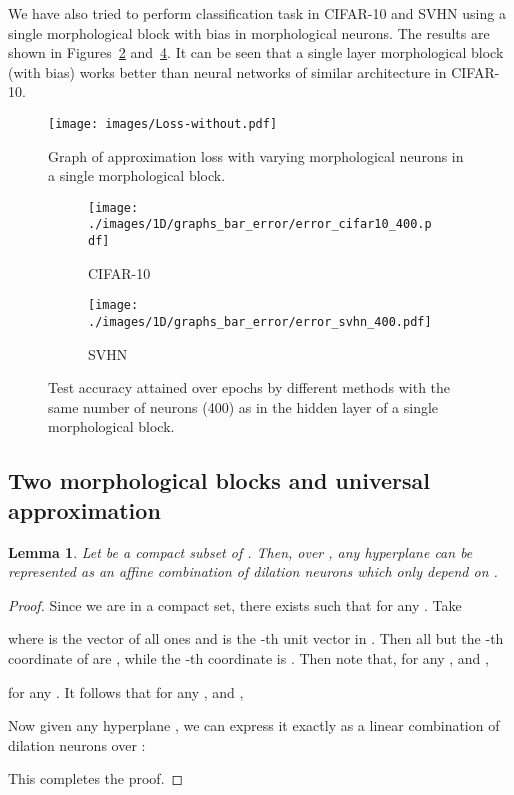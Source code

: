 \documentclass[12pt]{article}
\newtheorem{lemma}{Lemma}
\begin{document}
We have also tried to perform classification task in CIFAR-10 and SVHN using a single morphological block with bias in morphological neurons. The results are shown in Figures~\ref{cifar10_lc} and~\ref{svhn_lc}. It can be seen that a single layer morphological block (with bias) works better than neural networks of similar architecture in CIFAR-10.

\begin{figure}
    \centering
    \texttt{[image: images/Loss-without.pdf]}
    \caption{Graph of approximation loss with varying  morphological neurons in a single morphological block.}
    \label{fig:morph-block}
\end{figure}

\begin{figure}
    \centering
    \begin{subfigure}[t]{0.49\linewidth}
        \texttt{[image: ./images/1D/graphs\_bar\_error/error\_cifar10\_400.pdf]}
        \caption{CIFAR-10}
        \label{cifar10_lc}
    \end{subfigure}
    \begin{subfigure}[t]{0.49\linewidth}
        \texttt{[image: ./images/1D/graphs\_bar\_error/error\_svhn\_400.pdf]}
                \caption{SVHN}
        \label{svhn_lc}
            \end{subfigure}
\caption{Test accuracy attained over epochs by different methods with the same number of neurons (400) as in the hidden layer of a single morphological block.}
\end{figure}

\subsection{Two morphological blocks and universal approximation}

\begin{lemma}\label{lem:hyp_rep}
Let  be a compact subset of . Then, over , any hyperplane  can be represented as an affine combination of  dilation neurons which only depend on .
\end{lemma}
\begin{proof}
Since we are in a compact set, there exists  such that  for any . Take 

where  is the vector of all ones and  is the -th unit vector in . Then all but the -th coordinate of  are , while the -th coordinate is . Then note that, for any , and ,

for any . It follows that for any , and ,


Now given any hyperplane , we can express it exactly as a linear combination of dilation neurons over :

This completes the proof.
\end{proof}
\end{document}
